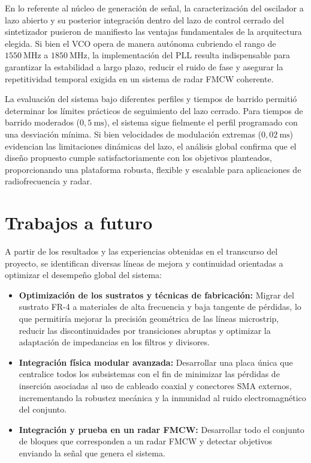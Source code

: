 En lo referente al núcleo de generación de señal, la caracterización del oscilador a lazo abierto y su posterior integración dentro del lazo de control cerrado del sintetizador pusieron de manifiesto las ventajas fundamentales de la arquitectura elegida. Si bien el VCO opera de manera autónoma cubriendo el rango de $1550~\mathrm{MHz}$ a $1850~\mathrm{MHz}$, la implementación del PLL resulta indispensable para garantizar la estabilidad a largo plazo, reducir el ruido de fase y asegurar la repetitividad temporal exigida en un sistema de radar FMCW coherente.

La evaluación del sistema bajo diferentes perfiles y tiempos de barrido permitió determinar los límites prácticos de seguimiento del lazo cerrado. Para tiempos de barrido moderados ($0{,}5~\mathrm{ms}$), el sistema sigue fielmente el perfil programado con una desviación mínima. Si bien velocidades de modulación extremas ($0{,}02~\mathrm{ms}$) evidencian las limitaciones dinámicas del lazo, el análisis global confirma que el diseño propuesto cumple satisfactoriamente con los objetivos planteados, proporcionando una plataforma robusta, flexible y escalable para aplicaciones de radiofrecuencia y radar.

\section*{Trabajos a futuro}

A partir de los resultados y las experiencias obtenidas en el transcurso del proyecto, se identifican diversas líneas de mejora y continuidad orientadas a optimizar el desempeño global del sistema:

\begin{itemize}
    \item \textbf{Optimización de los sustratos y técnicas de fabricación:} Migrar del sustrato FR-4 a materiales de alta frecuencia y baja tangente de pérdidas, lo que permitiría mejorar la precisión geométrica de las líneas microstrip, reducir las discontinuidades por transiciones abruptas y optimizar la adaptación de impedancias en los filtros y divisores.
    
    \item \textbf{Integración física modular avanzada:} Desarrollar una placa única que centralice todos los subsistemas con el fin de minimizar las pérdidas de inserción asociadas al uso de cableado coaxial y conectores SMA externos, incrementando la robustez mecánica y la inmunidad al ruido electromagnético del conjunto.
    \item \textbf{Integración y prueba en un radar FMCW:} Desarrollar todo el conjunto de bloques que corresponden a un radar FMCW y detectar objetivos enviando la señal que genera el sistema.
\end{itemize}
